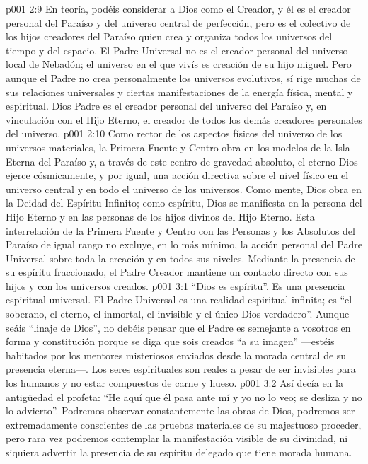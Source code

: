 \vs p001 2:9 \pc En teoría, podéis considerar a Dios como el Creador, y él es el creador personal del Paraíso y del universo central de perfección, pero es el colectivo de los hijos creadores del Paraíso quien crea y organiza todos los universos del tiempo y del espacio. El Padre Universal no es el creador personal del universo local de Nebadón; el universo en el que vivís es creación de su hijo miguel. Pero aunque el Padre no crea personalmente los universos evolutivos, sí rige muchas de sus relaciones universales y ciertas manifestaciones de la energía física, mental y espiritual. Dios Padre es el creador personal del universo del Paraíso y, en vinculación con el Hijo Eterno, el creador de todos los demás creadores personales del universo.
\vs p001 2:10 \pc Como rector de los aspectos físicos del universo de los universos materiales, la Primera Fuente y Centro obra en los modelos de la Isla Eterna del Paraíso y, a través de este centro de gravedad absoluto, el eterno Dios ejerce cósmicamente, y por igual, una acción directiva sobre el nivel físico en el universo central y en todo el universo de los universos. Como mente, Dios obra en la Deidad del Espíritu Infinito; como espíritu, Dios se manifiesta en la persona del Hijo Eterno y en las personas de los hijos divinos del Hijo Eterno. Esta interrelación de la Primera Fuente y Centro con las Personas y los Absolutos del Paraíso de igual rango no excluye, en lo más mínimo, la acción personal  del Padre Universal sobre toda la creación y en todos sus niveles. Mediante la presencia de su espíritu fraccionado, el Padre Creador mantiene un contacto directo con sus hijos y con los universos creados.
\vs p001 3:1 “Dios es espíritu”. Es una presencia espiritual universal. El Padre Universal es una realidad espiritual infinita; es “el soberano, el eterno, el inmortal, el invisible y el único Dios verdadero”. Aunque seáis “linaje de Dios”, no debéis pensar que el Padre es semejante a vosotros en forma y constitución porque se diga que sois creados “a su imagen” ---estéis habitados por los mentores misteriosos enviados desde la morada central de su presencia eterna---. Los seres espirituales son reales a pesar de ser invisibles para los humanos y no estar compuestos de carne y hueso.
\vs p001 3:2 Así decía en la antigüedad el profeta: “He aquí que él pasa ante mí y yo no lo veo; se desliza y no lo advierto”. Podremos observar constantemente las obras de Dios, podremos ser extremadamente conscientes de las pruebas materiales de su majestuoso proceder, pero rara vez podremos contemplar la manifestación visible de su divinidad, ni siquiera advertir la presencia de su espíritu delegado que tiene morada humana.

